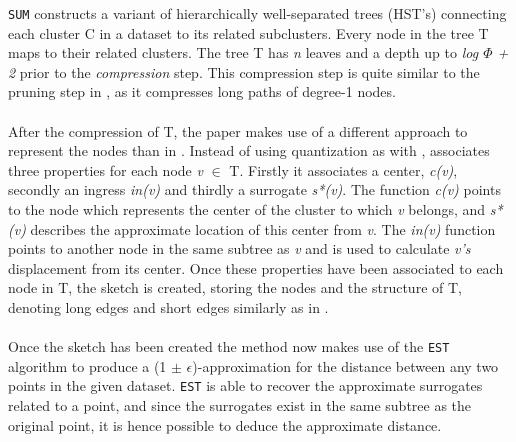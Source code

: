 \texttt{SUM} constructs a variant of hierarchically well-separated trees (HST's) connecting each cluster C in a dataset to its related subclusters. Every node in the tree T maps to their related clusters. The tree T has \textit{n} leaves and a depth up to \textit{log $\Phi$ + 2} prior to the \textit{compression} step. This compression step is quite similar to the pruning step in \cite{wagner17}, as it compresses long paths of degree-1 nodes.
\\
\\
After the compression of T, the paper \cite{NearO} makes use of a different approach to represent the nodes than in \cite{wagner17}. Instead of using quantization as with \qs{}, \cite{NearO} associates three properties for each node \textit{v} $\in$ T. Firstly it associates a center, \textit{c(v)}, secondly an ingress \textit{in(v)} and thirdly a surrogate \textit{s*(v)}. The function \textit{c(v)} points to the node which represents the center of the cluster to which \textit{v} belongs, and \textit{s*(v)} describes the approximate location of this center from \textit{v}. The \textit{in(v)} function points to another node in the same subtree as \textit{v} and is used to calculate \textit{v's} displacement from its center. Once these properties have been associated to each node in T, the sketch is created, storing the nodes and the structure of T, denoting long edges and short edges similarly as in \qs{}. 
\\
\\
Once the sketch has been created the method now makes use of the \texttt{EST} algorithm to produce a (1 $\pm$ $\epsilon$)-approximation for the distance between any two points in the given dataset. \texttt{EST} is able to recover the approximate surrogates related to a point, and since the surrogates exist in the same subtree as the original point, it is hence possible to deduce the approximate distance. 
